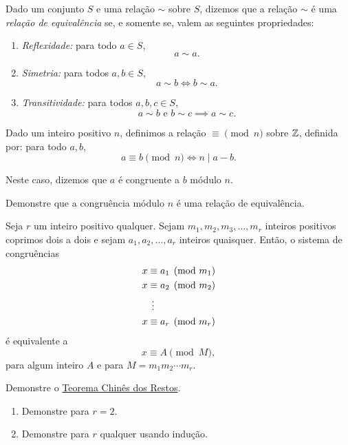 \documentclass[10pt, a4paper]{report}
\begin{document}
	\begin{defn}
		Dado um conjunto $S$ e uma relação $\sim$ sobre $S$, dizemos que a relação $\sim$ é uma \emph{relação de equivalência} se, e somente se, valem as seguintes propriedades:
		\begin{enumerate}[label = --]
			\item \emph{Reflexidade:} para todo $a \in S$, \[
				a \sim a.
			\]
			\item \emph{Simetria:} para todos $a, b \in S$, \[
				a \sim b \iff b \sim a.
			\]
			\item \emph{Transitividade:} para todos $a, b, c \in S$, \[
				a \sim b \text{\ e\ } b \sim c \implies a \sim c.
			\] 
		\end{enumerate}
	\end{defn}

	\begin{defn}
		Dado um inteiro positivo $n$, definimos a relação $\equiv \pmod{n}$ sobre $\mathbb{Z}$, definida por: para todo $a, b$, \[
			a \equiv b \pmod{n} \iff n \mid a - b.
		\]

		Neste caso, dizemos que $a$ é congruente a $b$ módulo $n$.
	\end{defn}

	\begin{exer}
		Demonstre que a congruência módulo $n$ é uma relação de equivalência.
	\end{exer}

	\begin{thm} \label{thm:tcr}
		Seja $r$ um inteiro positivo qualquer.
		Sejam $m_1, m_2, m_3, \dots, m_r$ inteiros positivos coprimos dois a dois e sejam $a_1, a_2, \dots, a_r$ inteiros quaisquer. Então, o sistema de congruências
		\begin{align*}
			x &\equiv a_1 \pmod{m_1} \\
			x &\equiv a_2 \pmod{m_2} \\
			&\hspace{1ex}\vdots\\
			x &\equiv a_r \pmod{m_r}
		\end{align*}
		é equivalente a \[
			x \equiv A \pmod{M},
		\]
		para algum inteiro $A$ e para $M = m_1m_2 \cdots m_r$.
	\end{thm}

	\begin{exer}
		Demonstre o \hyperref[thm:tcr]{Teorema Chinês dos Restos}.
		\begin{enumerate}[label = (\alph*)]
			\item Demonstre para $r = 2$. 
			\item Demonstre para $r$ qualquer usando indução.
		\end{enumerate}
	\end{exer}
\end{document}
